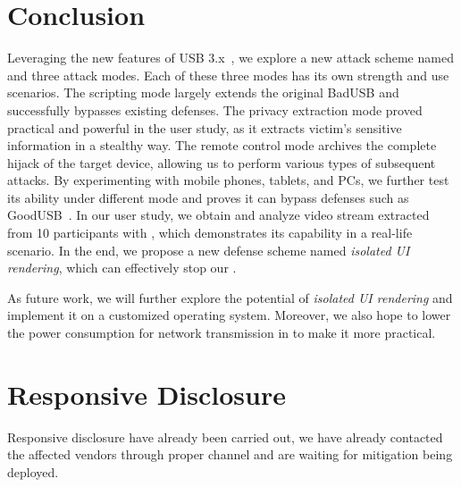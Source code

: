 \section{Conclusion}
\label{sec:conclusion}

Leveraging the new features of USB 3.x~\cite{usb31,usb31,usb32}, we explore a
new attack scheme named \tool and three attack modes. Each of these three modes
has its own strength and use scenarios. The scripting mode largely extends the
original BadUSB and successfully bypasses existing defenses. The privacy
extraction mode proved practical and powerful in the user study, as it extracts
victim's sensitive information in a stealthy way. The remote control mode
archives the complete hijack of the target device, allowing us to perform various
types of subsequent attacks. By experimenting \tool with mobile phones, tablets,
and PCs, we further test its ability under different mode and proves it can
bypass defenses such as GoodUSB~\cite{tian2015defending}. In our user study, we
obtain and analyze video stream extracted from 10 participants with \tool,
which demonstrates its capability in a real-life scenario. In the end, we
propose a new defense scheme named \textit{isolated UI rendering}, which can
effectively stop our \tool.

As future work, we will further explore the potential of \textit{isolated UI
rendering} and implement it on a customized operating system. Moreover, we also
hope to lower the power consumption for network transmission in \tool to make
it more practical.

\section{Responsive Disclosure}

Responsive disclosure have already been carried out, we have already contacted the affected vendors through proper channel and are waiting for mitigation being deployed.